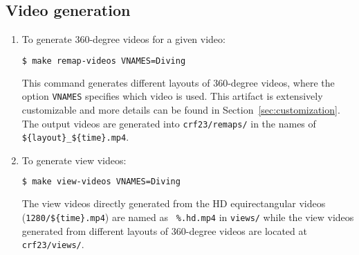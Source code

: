 \subsection{Video generation}
\label{sec:gen-videos}
\begin{enumerate}[leftmargin=*]
  \item To generate 360-degree videos for a given video:
\begin{lstlisting}[language=bash, numbers=none,  morekeywords={make, git, clone}]
$ make remap-videos VNAMES=Diving
\end{lstlisting}
    This command generates different layouts of 360-degree videos, where the option {\tt VNAMES} specifies which video
    is used. This artifact is extensively customizable and more details can be found in
    Section~\ref{sec:customization}. The output videos are generated into {\tt crf23/remaps/} in the names of {\tt
      \$\{layout\}\_\$\{time\}.mp4}.

  \item To generate view videos:
\begin{lstlisting}[language=bash, numbers=none,  morekeywords={make, git, clone}]
$ make view-videos VNAMES=Diving
\end{lstlisting}
The view videos directly generated from the HD equirectangular videos ({\tt 1280/\$\{time\}.mp4}) are named as {\tt
  \%.hd.mp4} in {\tt views/} while the view videos generated from different layouts of 360-degree videos are located at
{\tt crf23/views/}.
\end{enumerate}

